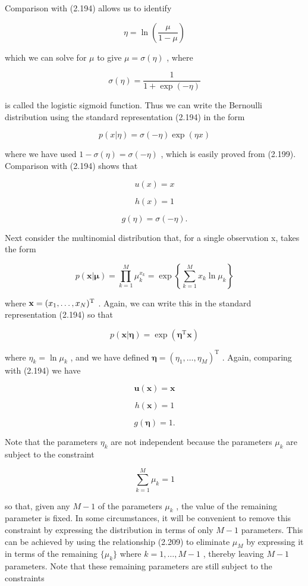 \documentclass[
  10
]{article}
\begin{document}
Comparison with (2.194) allows us to identify

\[
\eta = \ln \left(\frac {\mu}{1 - \mu}\right)\tag{2.198}
\]

which we can solve for \(\mu\) to give \(\mu = \sigma ( \eta )\) , where

\[
\sigma (\eta) = \frac {1}{1 + \exp (- \eta)}\tag{2.199}
\]

is called the logistic sigmoid function. Thus we can write the Bernoulli
distribution using the standard representation (2.194) in the form

\[
p (x | \eta) = \sigma (- \eta) \exp (\eta x)\tag{2.200}
\]

where we have used \(1 - \sigma ( \eta ) = \sigma ( - \eta )\) , which
is easily proved from (2.199). Comparison with (2.194) shows that

\[
u (x) = x\tag{2.201}
\]

\[
h (x) = 1\tag{2.202}
\]

\[
g (\eta) = \sigma (- \eta).\tag{2.203}
\]

Next consider the multinomial distribution that, for a single
observation x, takes the form

\[
p (\mathbf {x} | \boldsymbol {\mu}) = \prod_ {k = 1} ^ {M} \mu_ {k} ^ {x _ {k}} = \exp \left\{\sum_ {k = 1} ^ {M} x _ {k} \ln \mu_ {k} \right\}\tag{2.204}
\]

where
\({ \bf x } = ( x _ { 1 } , \ldots , x _ { N } ) ^ { \mathrm { T } }\) .
Again, we can write this in the standard representation (2.194) so that

\[
p (\mathbf {x} | \boldsymbol {\eta}) = \exp (\boldsymbol {\eta} ^ {\mathrm{T}} \mathbf {x})\tag{2.205}
\]

where \(\eta _ { k } = \ln \mu _ { k }\) , and we have defined
\(\pmb { \eta } = ( \eta _ { 1 } , \dots , \eta _ { M } ) ^ { \mathrm { T } }\)
. Again, comparing with (2.194) we have

\[
\mathbf {u} (\mathbf {x}) = \mathbf {x}\tag{2.206}
\]

\[
h (\mathbf {x}) = 1\tag{2.207}
\]

\[
g (\pmb {\eta}) = 1.\tag{2.208}
\]

Note that the parameters \(\eta _ { k }\) are not independent because
the parameters \(\mu _ { k }\) are subject to the constraint

\[
\sum_ {k = 1} ^ {M} \mu_ {k} = 1\tag{2.209}
\]

so that, given any \(M - 1\) of the parameters \(\mu _ { k }\) , the
value of the remaining parameter is fixed. In some circumstances, it
will be convenient to remove this constraint by expressing the
distribution in terms of only \(M - 1\) parameters. This can be achieved
by using the relationship (2.209) to eliminate \(\mu _ { M }\) by
expressing it in terms of the remaining \(\{ \mu _ { k } \}\) where
\(k = 1 , \ldots , M - 1\) , thereby leaving \(M - 1\) parameters. Note
that these remaining parameters are still subject to the constraints
\end{document}
